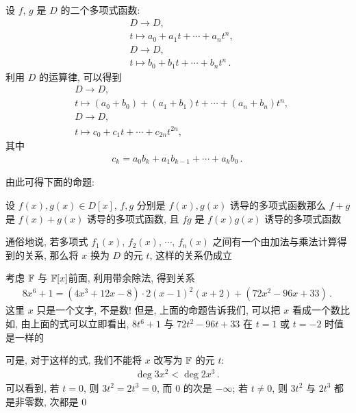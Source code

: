 \begin{remark}
    设 $f$, $g$ 是 $D$ 的二个多项式函数:
    \begin{align*}
         & D \to D, \tag*{$f \colon$}                       \\
         & t \mapsto a_0 + a_1 t + \cdots + a_n t^n,        \\
         & D \to D, \tag*{$g \colon$}                       \\
         & t \mapsto b_0 + b_1 t + \cdots + b_n t^n \period
    \end{align*}
    利用 $D$ 的运算律, 可以得到
    \begin{align*}
         & D \to D, \tag*{$f+g \colon$}                                      \\
         & t \mapsto (a_0 + b_0) + (a_1 + b_1) t + \cdots + (a_n + b_n) t^n, \\
         & D \to D, \tag*{$fg \colon$}                                       \\
         & t \mapsto c_0 + c_1 t + \cdots + c_{2n} t^{2n},
    \end{align*}
    其中
    \begin{align*}
        c_k = a_0 b_k + a_1 b_{k-1} + \cdots + a_k b_0 \period
    \end{align*}
\end{remark}

由此可得下面的命题:

\begin{proposition}
    设 $f(x),g(x) \in D[x]$, $f,g$ 分别是 $f(x),g(x)$ 诱导的多项式函数\period 那么 $f+g$ 是 $f(x)+g(x)$ 诱导的多项式函数, 且 $fg$ 是 $f(x)g(x)$ 诱导的多项式函数\period

    通俗地说, 若多项式 $f_1 (x)$, $f_2 (x)$, $\cdots$, $f_n (x)$ 之间有一个由加法与乘法计算得到的关系, 那么将 $x$ 换为 $D$ 的元 $t$, 这样的关系仍成立\period
\end{proposition}

\begin{example}
    考虑 $\mathbb{F}$ 与 $\mathbb{F}[x]$\period 前面, 利用带余除法, 得到关系
    \begin{align*}
        8x^6 + 1 = (4x^3 + 12x - 8) \cdot 2(x-1)^2 (x+2) + (72x^2 - 96x + 33) \period
    \end{align*}
    这里 $x$ 只是一个文字, 不是数! 但是, 上面的命题告诉我们, 可以把 $x$ 看成一个数\period 比如, 由上面的式可以立即看出, $8t^6 + 1$ 与 $72t^2 - 96t + 33$ 在 $t = 1$ 或 $t = -2$ 时值是一样的\period

    可是, 对于这样的式, 我们不能将 $x$ 改写为 $\mathbb{F}$ 的元 $t$:
    \begin{align*}
        \deg 3x^2 < \deg 2x^3 \period
    \end{align*}
    可以看到, 若 $t=0$, 则 $3t^2 = 2t^3 = 0$, 而 $0$ 的次是 $-\infty$; 若 $t \neq 0$, 则 $3t^2$ 与 $2t^3$ 都是非零数, 次都是 $0$\period
\end{example}

